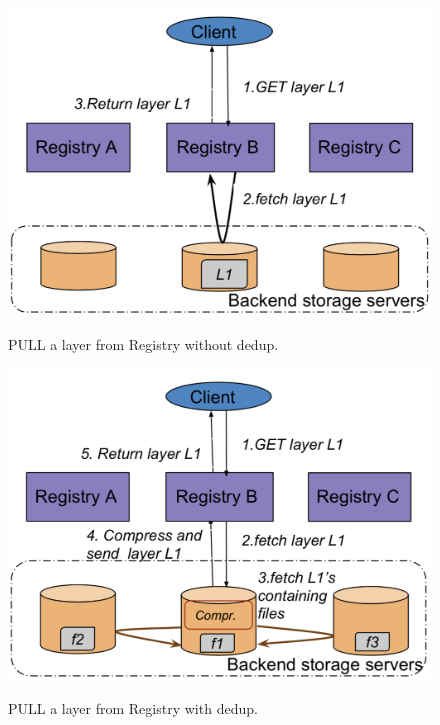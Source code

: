 \begin{figure}[t]
	\centering
		\begin{minipage}{0.225\textwidth}
			\centering
			\includegraphics[width=1\textwidth]{graphs/nodedup.png}
			\caption{PULL a layer from Registry without dedup.}
			\label{fig:ref_count}
		\end{minipage}
	\begin{minipage}{0.225\textwidth}
		\centering
		\includegraphics[width=1\textwidth]{graphs/dedup.png}
		\caption{PULL a layer from Registry with dedup.}
		\vspace{-3pt}
		\label{fig:nodedup-vs-dedup}
	\end{minipage}
\end{figure}